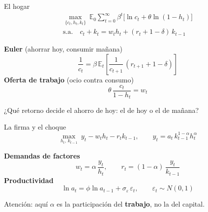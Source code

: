 \begin{frame}[label=hogar]{El hogar}
  \begin{gather*}
  \max_{\{c_t,h_t,k_t\}}\ \mathbb{E}_0\sum_{t=0}^{\infty}\beta^t\big[\ln c_t+\theta\ln(1-h_t)\big]\\
  \text{s.a.}\quad c_t+k_t=w_th_t+(r_t+1-\delta)\,k_{t-1}
  \end{gather*}
  \par\vspace{0.2cm}
  \textbf{Euler} (ahorrar hoy, consumir mañana)
  \[
  \frac{1}{c_t}=\beta\,\mathbb{E}_t\!\left[\frac{1}{c_{t+1}}\,(r_{t+1}+1-\delta)\right]
  \]
  \textbf{Oferta de trabajo} (ocio contra consumo)
  \[
  \theta\,\frac{c_t}{1-h_t}=w_t
  \]
  \par\vspace{0.1cm}
  ¿Qué retorno decide el ahorro de hoy: el de hoy o el de mañana?
\end{frame}

\begin{frame}[label=firma]{La firma y el choque}
  \[
  \max_{h_t,\,k_{t-1}}\ y_t-w_th_t-r_tk_{t-1},\qquad y_t=a_t\,k_{t-1}^{1-\alpha}h_t^{\alpha}
  \]
  \par\vspace{0.15cm}
  \textbf{Demandas de factores}
  \[
  w_t=\alpha\,\frac{y_t}{h_t},\qquad r_t=(1-\alpha)\,\frac{y_t}{k_{t-1}}
  \]
  \textbf{Productividad}
  \[
  \ln a_t=\phi\ln a_{t-1}+\sigma_\varepsilon\,\varepsilon_t,\qquad \varepsilon_t\sim N(0,1)
  \]
  \par\vspace{0.1cm}
  Atención: aquí $\alpha$ es la participación del \textbf{trabajo}, no la del capital.
\end{frame}

